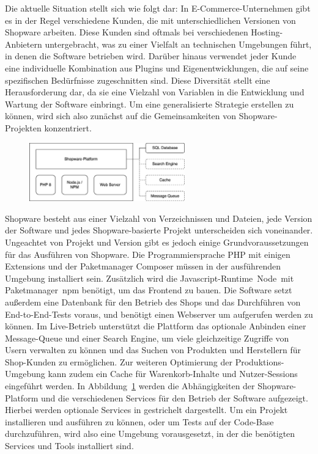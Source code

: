 Die aktuelle Situation stellt sich wie folgt dar: In E-Commerce-Unternehmen gibt es in der Regel verschiedene Kunden,
die mit unterschiedlichen Versionen von Shopware arbeiten.
Diese Kunden sind oftmals bei verschiedenen Hosting-Anbietern untergebracht, was zu einer Vielfalt an technischen
Umgebungen führt, in denen die Software betrieben wird.
Darüber hinaus verwendet jeder Kunde eine individuelle Kombination aus Plugins und Eigenentwicklungen, die auf seine
spezifischen Bedürfnisse zugeschnitten sind.
Diese Diversität stellt eine Herausforderung dar, da sie eine Vielzahl von Variablen in die Entwicklung und Wartung der
Software einbringt.
Um eine generalisierte Strategie erstellen zu können, wird sich also zunächst auf die Gemeinsamkeiten von
Shopware-Projekten konzentriert.
\begin{figure}[H]
    \centering
    \includegraphics[width=0.6\textwidth]{images/content/shopware-requirements}
    \label{fig:shopware-requirements}
\end{figure}
Shopware besteht aus einer Vielzahl von Verzeichnissen und Dateien, jede Version der Software und jedes
Shopware-basierte Projekt unterscheiden sich voneinander.
Ungeachtet von Projekt und Version gibt es jedoch einige Grundvoraussetzungen für das Ausführen von Shopware.
Die Programmiersprache PHP mit einigen Extensions und der Paketmanager Composer müssen in der ausführenden Umgebung
installiert sein.
Zusätzlich wird die Javascript-Runtime\ \glqq Node\grqq\ mit Paketmanager\ \acrshort{npm} benötigt, um das Frontend zu
bauen.
Die Software setzt außerdem eine Datenbank für den Betrieb des Shops und das Durchführen von End-to-End-Tests voraus,
und benötigt einen Webserver um aufgerufen werden zu können.
Im Live-Betrieb unterstützt die Plattform das optionale Anbinden einer Message-Queue und einer Search Engine, um viele
gleichzeitige Zugriffe von Usern verwalten zu können und das Suchen von Produkten und Herstellern für Shop-Kunden zu
ermöglichen.
Zur weiteren Optimierung der Produktions-Umgebung kann zudem ein Cache für Warenkorb-Inhalte und Nutzer-Sessions
eingeführt werden.
In Abbildung\ \ref{fig:shopware-requirements} werden die Abhängigkeiten der Shopware-Platform und die verschiedenen
Services für den Betrieb der Software aufgezeigt.
Hierbei werden optionale Services in gestrichelt dargestellt.
Um ein Projekt installieren und ausführen zu können, oder um Tests auf der Code-Base durchzuführen, wird also eine
Umgebung vorausgesetzt, in der die benötigten Services und Tools installiert sind.

